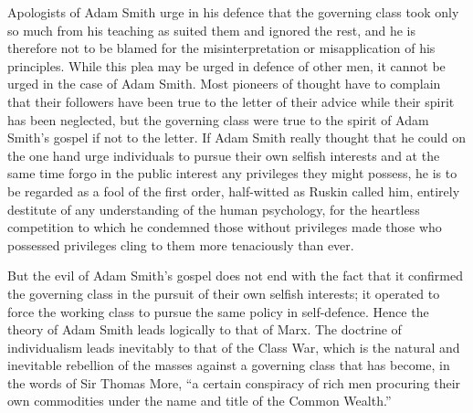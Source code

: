 \documentclass{book}
\begin{document}
Apologists of Adam Smith urge in his defence that the governing class took only so much from his teaching as suited them and ignored the rest, and he is therefore not to be blamed for the misinterpretation or misapplication of his principles. While this plea may be urged in defence of other men, it cannot be urged in the case of Adam Smith. Most pioneers of thought have to complain that their followers have been true to the letter of their advice while their spirit has been neglected, but the governing class were true to the spirit of Adam Smith’s gospel if not to the letter. If Adam Smith really thought that he could on the one hand urge individuals to pursue their own selfish interests and at the same time forgo in the public interest any privileges they might possess, he is to be regarded as a fool of the first order, half-witted as Ruskin called him, entirely destitute of any understanding of the human psychology, for the heartless competition to which he condemned those without privileges made those who possessed privileges cling to them more tenaciously than ever.

But the evil of Adam Smith’s gospel does not end with the fact that it confirmed the governing class in the pursuit of their own selfish interests; it operated to force the working class to pursue the same policy in self-defence. Hence the theory of Adam Smith leads logically to that of Marx. The doctrine of individualism leads inevitably to that of the Class War, which is the natural and inevitable rebellion of the masses against a governing class that has become, in the words of Sir Thomas More, “a certain conspiracy of rich men procuring their own commodities under the name and title of the Common Wealth.”
\end{document}

